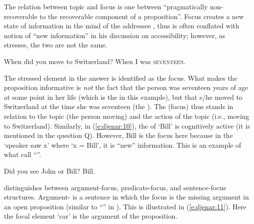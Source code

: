 \documentclass[output=paper
,modfonts
,nonflat]{langsci/langscibook}
\begin{document}
\noindent
The relation between topic and focus is one between “pragmatically non-recoverable to the recoverable component of a proposition”. Focus creates a new state of information in the mind of the addressee \citep[218]{Lambrecht1994}, thus is often conflated with  notion of “new information” in his discussion on  accessibility; however, as \citet[see chapter3]{Lambrecht1994} stresses, the two are not the same. 

\begin{exe}
	\ex\label{e:djenar:9}
	\begin{xlist}
		 When did you move to Switzerland?
		 When I was \textsc{seventeen}. \\
		\hfill \citep[48, 217]{Lambrecht1994}
	\end{xlist}
\end{exe}

\noindent
The stressed element in the answer is identified as the focus. What makes the proposition informative is \textit{not} the fact that the person was seventeen years of age at some point in her life (which is the  in this example), but that s/he moved to Switzerland at the time she was seventeen (the ). The  (focus) thus stands in relation to the topic (the person moving) and the action of the topic  (i.e., moving to Switzerland). Similarly, in (\ref{e:djenar:10}), the  of ‘Bill’ is cognitively active (it is mentioned in the question Q). However, Bill is the focus here because in the  ‘speaker saw x’ where ‘x = Bill’, it is “new” information. This is an example of what \citet[182]{Gundel2004} call “”. 

\begin{exe}
	\ex\label{e:djenar:10}
	\begin{xlist}
		 Did you see John or Bill?
		 Bill.\\
		\hfill \citep[205]{VanValin1997}
	\end{xlist}
\end{exe}

\noindent
\citet[221--235]{Lambrecht1994} distinguishes between argument-focus, predicate-focus, and sentence-focus structures. Argument- is a sentence in which the focus is the missing argument in an open proposition (similar to “” in \citealt{Givón1975}). This is illustrated in (\ref{e:djenar:11}). Here the focal element ‘car’ is the argument of the proposition. 
\end{document}
